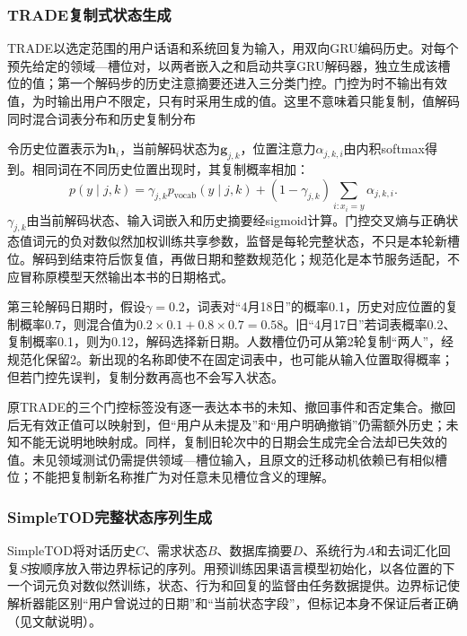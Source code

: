 \subsubsection{TRADE复制式状态生成}
\label{sec:nlp-dialogue-trade}

TRADE以选定范围的用户话语和系统回复为输入，用双向GRU编码历史。对每个预先给定的领域—槽位对，以两者嵌入之和启动共享GRU解码器，独立生成该槽位的值；第一个解码步的历史注意摘要还进入三分类门控。门控为时不输出有效值，为时输出用户不限定，只有时采用生成的值。这里不意味着只能复制，值解码同时混合词表分布和历史复制分布

令历史位置表示为$\bm{h}_i$，当前解码状态为$\bm{g}_{j,k}$，位置注意力$\alpha_{j,k,i}$由内积softmax得到。相同词在不同历史位置出现时，其复制概率相加：
\begin{equation}
 p(y\mid j,k)=
 \gamma_{j,k}p_{\mathrm{vocab}}(y\mid j,k)
 + (1-\gamma_{j,k})\sum_{i:x_i=y}\alpha_{j,k,i}.
 \label{eq:nlp-dialogue-trade}
\end{equation}
$\gamma_{j,k}$由当前解码状态、输入词嵌入和历史摘要经sigmoid计算。门控交叉熵与正确状态值词元的负对数似然加权训练共享参数，监督是每轮完整状态，不只是本轮新槽位。解码到结束符后恢复值，再做日期和整数规范化；规范化是本节服务适配，不应冒称原模型天然输出本书的日期格式。

第三轮解码日期时，假设$\gamma=0.2$，词表对“4月18日”的概率0.1，历史对应位置的复制概率0.7，则混合值为$0.2\times0.1+0.8\times0.7=0.58$。旧“4月17日”若词表概率0.2、复制概率0.1，则为0.12，解码选择新日期。人数槽位仍可从第2轮复制“两人”，经规范化保留2。新出现的名称即使不在固定词表中，也可能从输入位置取得概率；但若门控先误判，复制分数再高也不会写入状态。

原TRADE的三个门控标签没有逐一表达本书的未知、撤回事件和否定集合。撤回后无有效正值可以映射到，但“用户从未提及”和“用户明确撤销”仍需额外历史；未知不能无说明地映射成。同样，复制旧轮次中的日期会生成完全合法却已失效的值。未见领域测试仍需提供领域—槽位输入，且原文的迁移动机依赖已有相似槽位；不能把复制新名称推广为对任意未见槽位含义的理解。

\subsubsection{SimpleTOD完整状态序列生成}
\label{sec:nlp-dialogue-simpletod}

SimpleTOD将对话历史$C$、需求状态$B$、数据库摘要$D$、系统行为$A$和去词汇化回复$S$按顺序放入带边界标记的序列。用预训练因果语言模型初始化，以各位置的下一个词元负对数似然训练，状态、行为和回复的监督由任务数据提供。边界标记使解析器能区别“用户曾说过的日期”和“当前状态字段”，但标记本身不保证后者正确（见文献说明）。

